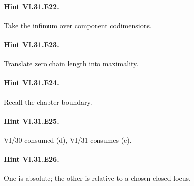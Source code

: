 \paragraph{Hint VI.31.E22.} Take the infimum over component codimensions.

\paragraph{Hint VI.31.E23.} Translate zero chain length into maximality.

\paragraph{Hint VI.31.E24.} Recall the chapter boundary.

\paragraph{Hint VI.31.E25.} VI/30 consumed (d), VI/31 consumes (c).

\paragraph{Hint VI.31.E26.} One is absolute; the other is relative to a chosen closed locus.
